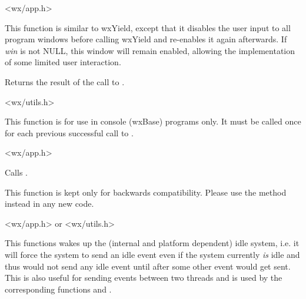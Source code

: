<wx/app.h>


\label{wxsafeyield}


This function is similar to wxYield, except that it disables the user input to
all program windows before calling wxYield and re-enables it again
afterwards. If {\it win} is not NULL, this window will remain enabled,
allowing the implementation of some limited user interaction.

Returns the result of the call to .


<wx/utils.h>


\label{wxuninitialize}


This function is for use in console (wxBase) programs only. It must be called
once for each previous successful call to .


<wx/app.h>


\label{wxyield}


Calls .

This function is kept only for backwards compatibility. Please use
the  method instead in any new code.


<wx/app.h> or <wx/utils.h>


\label{wxwakeupidle}


This functions wakes up the (internal and platform dependent) idle system, i.e. it
will force the system to send an idle event even if the system currently {\it is}
 idle and thus would not send any idle event until after some other event would get
sent. This is also useful for sending events between two threads and is used by
the corresponding functions  and
.


